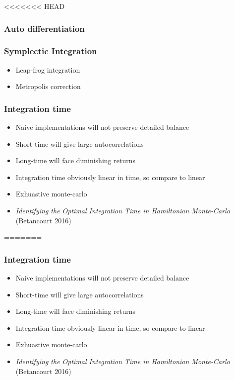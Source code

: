 \documentclass[11pt]{report}
\begin{document}
<<<<<<< HEAD
\subsubsection{Auto differentiation}

\subsubsection{Symplectic Integration}

\begin{itemize}
\item Leap-frog integration
\item Metropolis correction
\end{itemize}

\subsubsection{Integration time}

\begin{itemize}
\item Naive implementations will not preserve detailed balance
\item Short-time will give large autocorrelations
\item Long-time will face diminishing returns
\item Integration time obviously linear in time, so compare to linear
\item Exhuastive monte-carlo
\item \emph{Identifying the Optimal Integration Time in Hamiltonian Monte-Carlo} (Betancourt 2016)
\end{itemize}

=======
\subsubsection{Integration time}

\begin{itemize}
\item Naive implementations will not preserve detailed balance
\item Short-time will give large autocorrelations
\item Long-time will face diminishing returns
\item Integration time obviously linear in time, so compare to linear
\item Exhuastive monte-carlo
\item \emph{Identifying the Optimal Integration Time in Hamiltonian Monte-Carlo} (Betancourt 2016)
\end{itemize}
\end{document}
